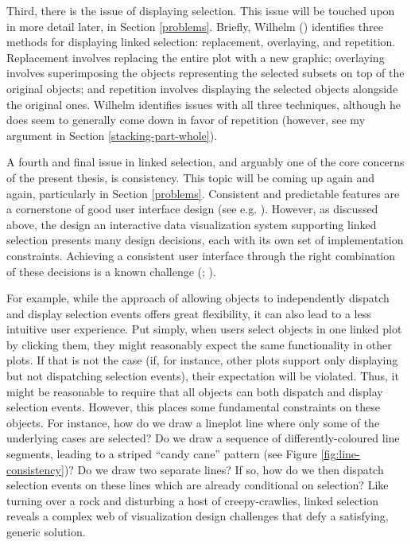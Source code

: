 \documentclass[
]{book}
\begin{document}
Third, there is the issue of displaying selection. This issue will be touched upon in more detail later, in Section \ref{problems}. Briefly, Wilhelm () identifies three methods for displaying linked selection: replacement, overlaying, and repetition. Replacement involves replacing the entire plot with a new graphic; overlaying involves superimposing the objects representing the selected subsets on top of the original objects; and repetition involves displaying the selected objects alongside the original ones. Wilhelm identifies issues with all three techniques, although he does seem to generally come down in favor of repetition (however, see my argument in Section \ref{stacking-part-whole}).

A fourth and final issue in linked selection, and arguably one of the core concerns of the present thesis, is consistency. This topic will be coming up again and again, particularly in Section \ref{problems}. Consistent and predictable features are a cornerstone of good user interface design (see e.g. ). However, as discussed above, the design an interactive data visualization system supporting linked selection presents many design decisions, each with its own set of implementation constraints. Achieving a consistent user interface through the right combination of these decisions is a known challenge (; ).

For example, while the approach of allowing objects to independently dispatch and display selection events offers great flexibility, it can also lead to a less intuitive user experience. Put simply, when users select objects in one linked plot by clicking them, they might reasonably expect the same functionality in other plots. If that is not the case (if, for instance, other plots support only displaying but not dispatching selection events), their expectation will be violated. Thus, it might be reasonable to require that all objects can both dispatch and display selection events. However, this places some fundamental constraints on these objects. For instance, how do we draw a lineplot line where only some of the underlying cases are selected? Do we draw a sequence of differently-coloured line segments, leading to a striped ``candy cane'' pattern (see Figure \ref{fig:line-consistency})? Do we draw two separate lines? If so, how do we then dispatch selection events on these lines which are already conditional on selection? Like turning over a rock and disturbing a host of creepy-crawlies, linked selection reveals a complex web of visualization design challenges that defy a satisfying, generic solution.
\end{document}
